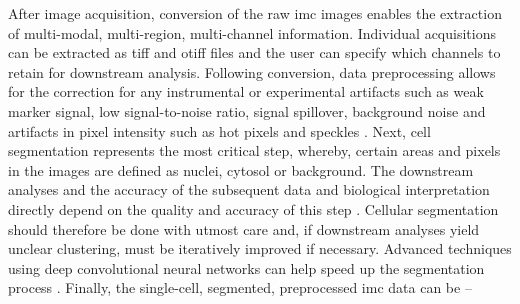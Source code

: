 
\par After image acquisition, conversion of the raw \gls{imc} images enables the extraction of multi-modal, multi-region, multi-channel information. Individual acquisitions can be extracted as \gls{tiff} and \gls{otiff} files and the user can specify which channels to retain for downstream analysis. Following conversion, data preprocessing allows for the correction for any instrumental or experimental artifacts such as weak marker signal, low signal-to-noise ratio, signal spillover, background noise and artifacts in pixel intensity such as hot pixels and speckles \textbf{\cite{milosevic_different_2023}}. Next, cell segmentation represents the most critical step, whereby, certain areas and pixels in the images are defined as nuclei, cytosol or background. The downstream analyses and the accuracy of the subsequent data and biological interpretation directly depend on the quality and accuracy of this step \textbf{\cite{milosevic_different_2023}}. Cellular segmentation should therefore be done with utmost care and, if downstream analyses yield unclear clustering, must be iteratively improved if necessary. Advanced techniques using deep convolutional neural networks can help speed up the segmentation process \textbf{\cite{jung_automatic_2019,fujita_cell_2021}}. Finally, the single-cell, segmented, preprocessed \gls{imc} data can be --

